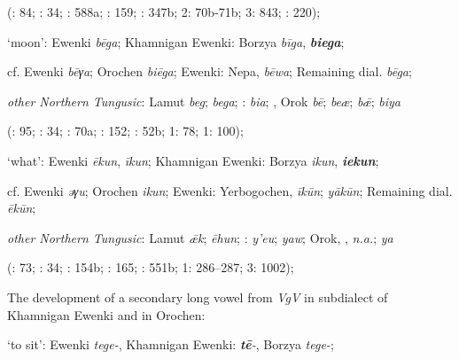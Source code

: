 \documentclass[output=paper,colorlinks,citecolor=brown]{langscibook}
\begin{document}
    (\citealt{Castrén1856}: 84; \citealt{Janhunen1991}: 34; \citealt{Dorji1998}: 588a; \citealt{Chaoke2014a}: 159; \citealt{Vasilevic1958}: 347b; \citealt{Cincius1975B} 2: 70b-71b; \citealt{Hauer1952} 3: 843; \citealt{Zikmundová2013a}: 220); 

    \ex ‘moon’:  Ewenki \textit{bēga}; Khamnigan Ewenki: Borzya \textit{bīga},  \textbf{\textit{biega}};

    cf.  Ewenki \textit{bēγa}; Orochen \textit{biēga};  Ewenki: Nepa,  \textit{bēwa}; Remaining dial. \textit{bēga};

    \textit{other Northern Tungusic}: Lamut \textit{beg};  \textit{bega}; \textit{}:  \textit{bia}; , Orok \textit{bē};  \textit{beæ};  \textit{b\={æ}};  \textit{biya}
    
    (\citealt{Castrén1856}: 95; \citealt{Janhunen1991}: 34; \citealt{Dorji1998}: 70a; \citealt{Chaoke2014a}: 152; \citealt{Vasilevic1958}: 52b; \citealt{Cincius1975B} 1: 78; \citealt{Hauer1952} 1: 100); 

    \ex ‘what’:  Ewenki \textit{ēkun},  \textit{īkun}; Khamnigan Ewenki: Borzya \textit{ikun},  \textbf{\textit{iekun}};

    cf.  Ewenki \textit{ǝγu}; Orochen \textit{ikun};  Ewenki: Yerbogochen,  \textit{īkūn};  \textit{yākūn}; Remaining dial. \textit{ēkūn};

    \textit{other Northern Tungusic}: Lamut \textit{\={æ}k};  \textit{ēhun}; \textit{}:  \textit{y’eu};  \textit{yaw}; Orok, ,  \textit{n.a.};  \textit{ya} 
    
    (\citealt{Castrén1856}: 73; \citealt{Janhunen1991}: 34; \citealt{Dorji1998}: 154b; \citealt{Chaoke2014a}: 165; \citealt{Vasilevic1958}: 551b; \citealt{Cincius1975B} 1: 286--287; \citealt{Hauer1952} 3: 1002);

\z
\z


\ea
The development of a secondary long vowel from \textit{VgV} in  subdialect of Khamnigan Ewenki and in Orochen:

\ea ‘to sit’:  Ewenki \textit{tege-}, Khamnigan Ewenki:  \textbf{\textit{tē}}\textit{{}-}, Borzya \textit{tege-};
\end{document}
